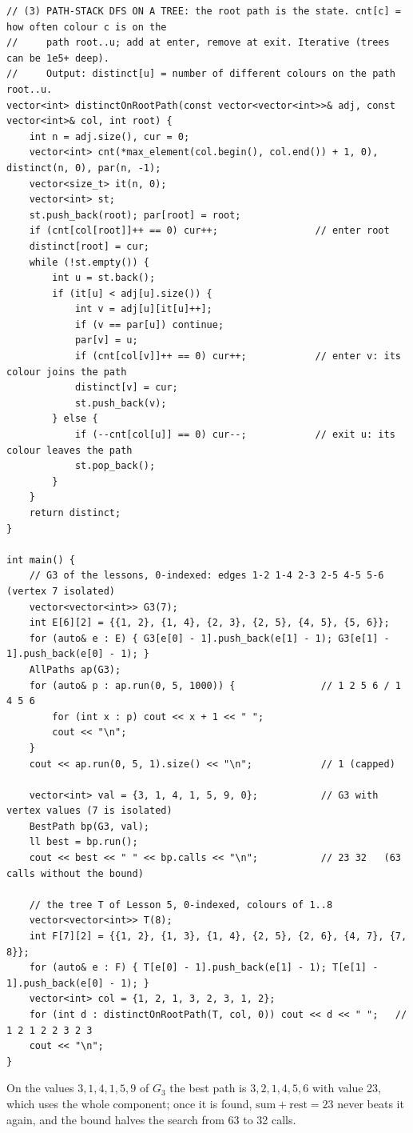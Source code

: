 \begin{lstlisting}[style=cpp]
// (3) PATH-STACK DFS ON A TREE: the root path is the state. cnt[c] = how often colour c is on the
//     path root..u; add at enter, remove at exit. Iterative (trees can be 1e5+ deep).
//     Output: distinct[u] = number of different colours on the path root..u.
vector<int> distinctOnRootPath(const vector<vector<int>>& adj, const vector<int>& col, int root) {
    int n = adj.size(), cur = 0;
    vector<int> cnt(*max_element(col.begin(), col.end()) + 1, 0), distinct(n, 0), par(n, -1);
    vector<size_t> it(n, 0);
    vector<int> st;
    st.push_back(root); par[root] = root;
    if (cnt[col[root]]++ == 0) cur++;                 // enter root
    distinct[root] = cur;
    while (!st.empty()) {
        int u = st.back();
        if (it[u] < adj[u].size()) {
            int v = adj[u][it[u]++];
            if (v == par[u]) continue;
            par[v] = u;
            if (cnt[col[v]]++ == 0) cur++;            // enter v: its colour joins the path
            distinct[v] = cur;
            st.push_back(v);
        } else {
            if (--cnt[col[u]] == 0) cur--;            // exit u: its colour leaves the path
            st.pop_back();
        }
    }
    return distinct;
}

int main() {
    // G3 of the lessons, 0-indexed: edges 1-2 1-4 2-3 2-5 4-5 5-6 (vertex 7 isolated)
    vector<vector<int>> G3(7);
    int E[6][2] = {{1, 2}, {1, 4}, {2, 3}, {2, 5}, {4, 5}, {5, 6}};
    for (auto& e : E) { G3[e[0] - 1].push_back(e[1] - 1); G3[e[1] - 1].push_back(e[0] - 1); }
    AllPaths ap(G3);
    for (auto& p : ap.run(0, 5, 1000)) {               // 1 2 5 6 / 1 4 5 6
        for (int x : p) cout << x + 1 << " ";
        cout << "\n";
    }
    cout << ap.run(0, 5, 1).size() << "\n";            // 1 (capped)

    vector<int> val = {3, 1, 4, 1, 5, 9, 0};           // G3 with vertex values (7 is isolated)
    BestPath bp(G3, val);
    ll best = bp.run();
    cout << best << " " << bp.calls << "\n";           // 23 32   (63 calls without the bound)

    // the tree T of Lesson 5, 0-indexed, colours of 1..8
    vector<vector<int>> T(8);
    int F[7][2] = {{1, 2}, {1, 3}, {1, 4}, {2, 5}, {2, 6}, {4, 7}, {7, 8}};
    for (auto& e : F) { T[e[0] - 1].push_back(e[1] - 1); T[e[1] - 1].push_back(e[0] - 1); }
    vector<int> col = {1, 2, 1, 3, 2, 3, 1, 2};
    for (int d : distinctOnRootPath(T, col, 0)) cout << d << " ";   // 1 2 1 2 2 3 2 3
    cout << "\n";
}
\end{lstlisting}

On the values $3, 1, 4, 1, 5, 9$ of $G_3$ the best path is $3, 2, 1, 4, 5, 6$ with value 23, which uses the whole component; once it is found, $\text{sum} + \text{rest} = 23$ never beats it again, and the bound halves the search from 63 to 32 calls.

